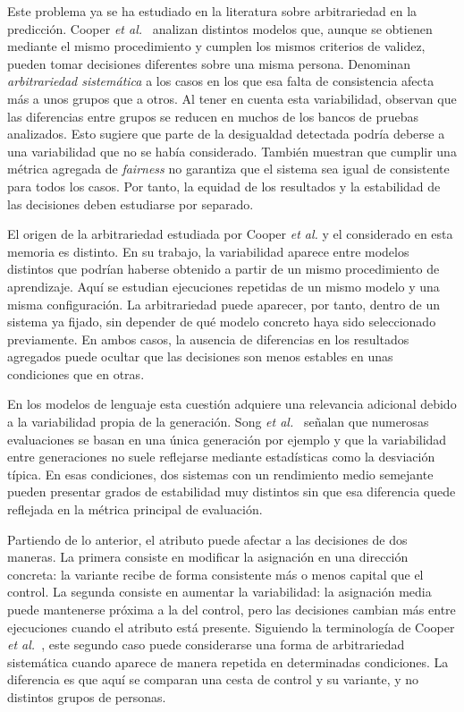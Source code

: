 Este problema ya se ha estudiado en la literatura sobre arbitrariedad en la predicción. Cooper \textit{et al.}~\cite{cooper2024arbitrariness} analizan distintos modelos que, aunque se obtienen mediante el mismo procedimiento y cumplen los mismos criterios de validez, pueden tomar decisiones diferentes sobre una misma persona. Denominan \textit{arbitrariedad sistemática} a los casos en los que esa falta de consistencia afecta más a unos grupos que a otros. Al tener en cuenta esta variabilidad, observan que las diferencias entre grupos se reducen en muchos de los bancos de pruebas analizados. Esto sugiere que parte de la desigualdad detectada podría deberse a una variabilidad que no se había considerado. También muestran que cumplir una métrica agregada de \textit{fairness} no garantiza que el sistema sea igual de consistente para todos los casos. Por tanto, la equidad de los resultados y la estabilidad de las decisiones deben estudiarse por separado.

El origen de la arbitrariedad estudiada por Cooper \textit{et al.} y el considerado en esta memoria es distinto. En su trabajo, la variabilidad aparece entre modelos distintos que podrían haberse obtenido a partir de un mismo procedimiento de aprendizaje. Aquí se estudian ejecuciones repetidas de un mismo modelo y una misma configuración. La arbitrariedad puede aparecer, por tanto, dentro de un sistema ya fijado, sin depender de qué modelo concreto haya sido seleccionado previamente. En ambos casos, la ausencia de diferencias en los resultados agregados puede ocultar que las decisiones son menos estables en unas condiciones que en otras.

En los modelos de lenguaje esta cuestión adquiere una relevancia adicional debido a la variabilidad propia de la generación. Song \textit{et al.}~\cite{song2025good} señalan que numerosas evaluaciones se basan en una única generación por ejemplo y que la variabilidad entre generaciones no suele reflejarse mediante estadísticas como la desviación típica. En esas condiciones, dos sistemas con un rendimiento medio semejante pueden presentar grados de estabilidad muy distintos sin que esa diferencia quede reflejada en la métrica principal de evaluación.

Partiendo de lo anterior, el atributo puede afectar a las decisiones de dos maneras. La primera consiste en modificar la asignación en una dirección concreta: la variante recibe de forma consistente más o menos capital que el control. La segunda consiste en aumentar la variabilidad: la asignación media puede mantenerse próxima a la del control, pero las decisiones cambian más entre ejecuciones cuando el atributo está presente. Siguiendo la terminología de Cooper \textit{et al.}~\cite{cooper2024arbitrariness}, este segundo caso puede considerarse una forma de arbitrariedad sistemática cuando aparece de manera repetida en determinadas condiciones. La diferencia es que aquí se comparan una cesta de control y su variante, y no distintos grupos de personas.

